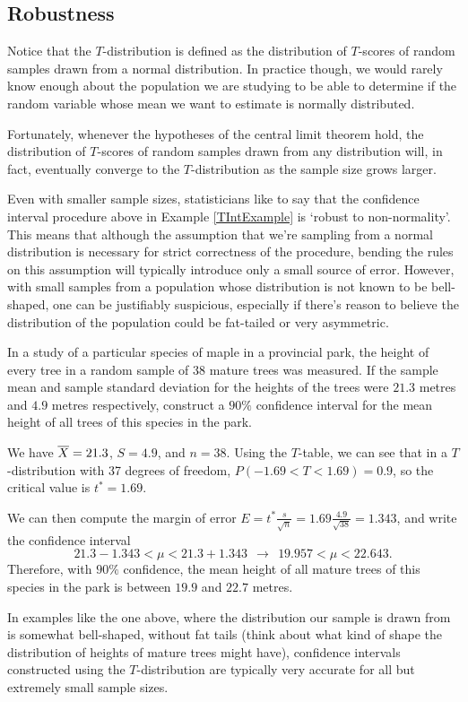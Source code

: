 \subsection*{Robustness}
Notice that the $T$-distribution is defined as the distribution of $T$-scores of random samples drawn from a normal distribution. In practice though, we would rarely know enough about the population we are studying to be able to determine if the random variable whose mean we want to estimate is normally distributed.
\par
Fortunately, whenever the hypotheses of the central limit theorem hold, the distribution of $T$-scores of random samples drawn from any distribution will, in fact, eventually converge to the $T$-distribution \cite{AsymptoticTDist} as the sample size grows larger. 
\par
Even with smaller sample sizes, statisticians like to say that the confidence interval procedure above in Example \ref{TIntExample} is `robust to non-normality'. This means that although the assumption that we're sampling from a normal distribution is necessary for strict correctness of the procedure, bending the rules on this assumption will typically introduce only a small source of error. However, with small samples from a population whose distribution is not known to be bell-shaped, one can be justifiably suspicious, especially if there's reason to believe the distribution of the population could be fat-tailed or very asymmetric.
\par
\begin{examp}
In a study of a particular species of maple in a provincial park, the height of every tree in a random sample of 38 mature trees was measured. If the sample mean and sample standard deviation for the heights of the trees were $21.3$ metres and $4.9$ metres respectively, construct a $90\%$ confidence interval for the mean height of all trees of this species in the park.
\par
\noindent We have ${\overline{X}} = 21.3$, $S = 4.9$, and $n = 38$. Using the $T$-table, we can see that in a $T$-distribution with 37 degrees of freedom, $P(-1.69 < T < 1.69) = 0.9$, so the critical value is $t^* = 1.69$.
\par
\noindent
We can then compute the margin of error $E = t^* \frac{s}{\sqrt{n}} = 1.69 \frac{4.9}{\sqrt{38}} = 1.343$, and write the confidence interval
$$21.3-1.343 < \mu < 21.3+1.343 \ \ \rightarrow \ \ 19.957 < \mu < 22.643.$$
Therefore, with $90\%$ confidence, the mean height of all mature trees of this species in the park is between $19.9$ and $22.7$ metres.
\end{examp}
\par
In examples like the one above, where the distribution our sample is drawn from is somewhat bell-shaped, without fat tails (think about what kind of shape the distribution of heights of mature trees might have), confidence intervals constructed using the $T$-distribution are typically very accurate for all but extremely small sample sizes.








